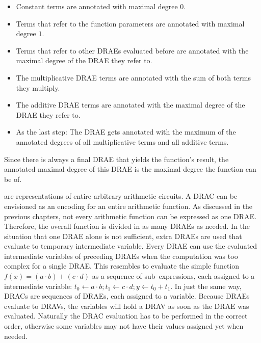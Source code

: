 \begin{itemize}

  \item Constant terms are annotated with maximal degree $0$.

  \item Terms that refer to the function parameters are annotated with maximal
    degree $1$.

  \item Terms that refer to other DRAEs evaluated before are annotated with the
    maximal degree of the DRAE they refer to.

  \item The multiplicative DRAE terms are annotated with the sum of both terms
    they multiply.

  \item The additive DRAE terms are annotated with the maximal degree of the
    DRAE they refer to.

  \item As the last step: The DRAE gets annotated with the maximum of the
    annotated degrees of all multiplicative terms and all additive terms.

\end{itemize}

Since there is always a final DRAE that yields the function's result, the
annotated maximal degree of this DRAE is the maximal degree the function can be
of.


%
%
\label{sec:drac}

 are representations of entire
arbitrary arithmetic circuits. A DRAC can be envisioned as an encoding for an
entire arithmetic function. As discussed in the previous chapters, not every
arithmetic function can be expressed as one DRAE. Therefore, the overall
function is divided in as many DRAEs as needed. In the situation that one DRAE
alone is not sufficient, extra DRAEs are used that evaluate to temporary
intermediate variable. Every DRAE can use the evaluated intermediate variables
of preceding DRAEs when the computation was too complex for a single DRAE. This
resembles to evaluate the simple function $f(x) = (a \cdot b) + (c \cdot d)$ as
a sequence of sub--expressions, each assigned to a intermediate variable: $t_0
\leftarrow a \cdot b; t_1 \leftarrow c \cdot d; y \leftarrow t_0 + t_1$.  In
just the same way, DRACs are sequences of DRAEs, each assigned to a variable.
Because DRAEs evaluate to DRAVs, the variables will hold a DRAV as soon as the
DRAE was evaluated. Naturally the DRAC evaluation has to be performed in the
correct order, otherwise some variables may not have their values assigned yet
when needed.


